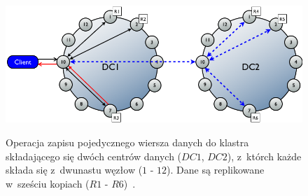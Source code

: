\begin{figure}[!ht]
 \begin{center}
  \scalebox{0.4}
  {
   \includegraphics{figures/generated_app_type/cassandra_architecture.png}
  }
 \end{center}
 \caption{Operacja zapisu pojedycznego wiersza danych do klastra składającego się dwóch centrów danych ($DC1$, $DC2$), z~którch każde składa się z~dwunastu węzłow ($1$ - $12$).
 Dane są replikowane w~sześciu kopiach ($R1$ - $R6$)~\cite{cassandra_architecture}.}
 \label{fig:cassandra_architecture}
\end{figure}
